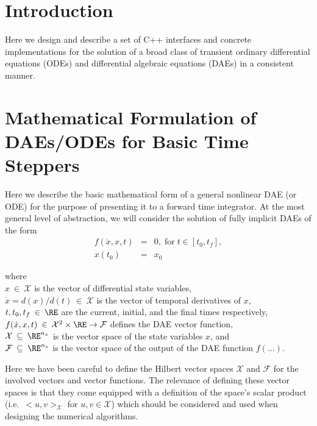 
\section{Introduction}

Here we design and describe a set of C++ interfaces and concrete implementations
for the solution of a broad class of transient ordinary differential
equations (ODEs) and differential algebraic equations (DAEs) in a
consistent manner. 


\section{Mathematical Formulation of DAEs/ODEs for Basic Time Steppers\label{rythmos:sec:mathformulation}}

Here we describe the basic mathematical form of a general nonlinear
DAE (or ODE) for the purpose of presenting it to a forward time integrator.
At the most general level of abstraction, we will consider the solution
of fully implicit DAEs of the form 
\begin{eqnarray}
f(\dot{x},x,t) & = & 0,\;\mbox{for}\; t\in[t_{0},t_{f}],\label{rythmos:eq:dae}\\
x(t_{0}) & = & x_{0}\label{rythmos:eq:dae:ic}
\end{eqnarray}
\begin{tabbing} where\hspace{5ex}\= \\
 \> $x\:\in\:\mathcal{X}$ is the vector of differential state variables,
\\
 \> $\dot{x}=d(x)/d(t)\:\in\:\mathcal{X}$ is the vector of temporal
derivatives of $x$, \\
 \> $t,t_{0},t_{f}\:\in\:\RE$ are the current, initial, and the
final times respectively, \\
 \> $f(\dot{x},x,t)\:\in\:\mathcal{X}^{2}\times\RE\rightarrow\mathcal{F}$
defines the DAE vector function, \\
 \> $\mathcal{X}\:\subseteq\:\RE^{n_{x}}$ is the vector space of
the state variables $x$, and \\
 \> $\mathcal{F}\:\subseteq\:\RE^{n_{x}}$ is the vector space of
the output of the DAE function $f(\ldots)$. \end{tabbing}

Here we have been careful to define the Hilbert vector spaces $\mathcal{X}$
and $\mathcal{F}$ for the involved vectors and vector functions.
The relevance of defining these vector spaces is that they come equipped
with a definition of the space's scalar product (i.e.\ $<u,v>_{\mathcal{X}}$
for $u,v\in\mathcal{X}$) which should be considered and used when
designing the numerical algorithms.

